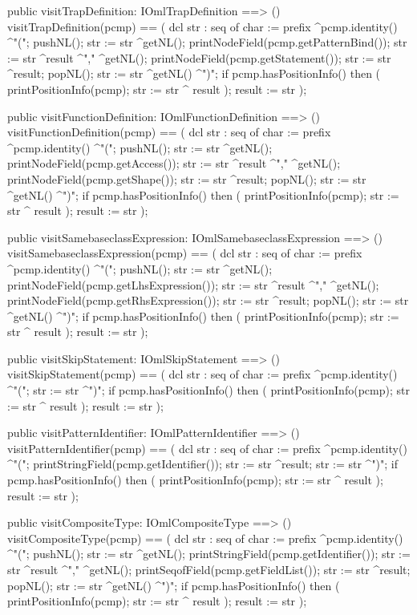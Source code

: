 \begin{vdm_al}
  public visitTrapDefinition: IOmlTrapDefinition ==> ()
  visitTrapDefinition(pcmp) ==
    ( dcl str : seq of char := prefix ^pcmp.identity() ^"(";
      pushNL();
      str := str ^getNL();
      printNodeField(pcmp.getPatternBind());
      str := str ^result ^"," ^getNL();
      printNodeField(pcmp.getStatement());
      str := str ^result;
      popNL();
      str := str ^getNL() ^")";
      if pcmp.hasPositionInfo()
      then ( printPositionInfo(pcmp);
             str := str ^ result );
      result := str );

  public visitFunctionDefinition: IOmlFunctionDefinition ==> ()
  visitFunctionDefinition(pcmp) ==
    ( dcl str : seq of char := prefix ^pcmp.identity() ^"(";
      pushNL();
      str := str ^getNL();
      printNodeField(pcmp.getAccess());
      str := str ^result ^"," ^getNL();
      printNodeField(pcmp.getShape());
      str := str ^result;
      popNL();
      str := str ^getNL() ^")";
      if pcmp.hasPositionInfo()
      then ( printPositionInfo(pcmp);
             str := str ^ result );
      result := str );

  public visitSamebaseclassExpression: IOmlSamebaseclassExpression ==> ()
  visitSamebaseclassExpression(pcmp) ==
    ( dcl str : seq of char := prefix ^pcmp.identity() ^"(";
      pushNL();
      str := str ^getNL();
      printNodeField(pcmp.getLhsExpression());
      str := str ^result ^"," ^getNL();
      printNodeField(pcmp.getRhsExpression());
      str := str ^result;
      popNL();
      str := str ^getNL() ^")";
      if pcmp.hasPositionInfo()
      then ( printPositionInfo(pcmp);
             str := str ^ result );
      result := str );

  public visitSkipStatement: IOmlSkipStatement ==> ()
  visitSkipStatement(pcmp) ==
    ( dcl str : seq of char := prefix ^pcmp.identity() ^"(";
      str := str ^")";
      if pcmp.hasPositionInfo()
      then ( printPositionInfo(pcmp);
             str := str ^ result );
      result := str );

  public visitPatternIdentifier: IOmlPatternIdentifier ==> ()
  visitPatternIdentifier(pcmp) ==
    ( dcl str : seq of char := prefix ^pcmp.identity() ^"(";
      printStringField(pcmp.getIdentifier());
      str := str ^result;
      str := str ^")";
      if pcmp.hasPositionInfo()
      then ( printPositionInfo(pcmp);
             str := str ^ result );
      result := str );

  public visitCompositeType: IOmlCompositeType ==> ()
  visitCompositeType(pcmp) ==
    ( dcl str : seq of char := prefix ^pcmp.identity() ^"(";
      pushNL();
      str := str ^getNL();
      printStringField(pcmp.getIdentifier());
      str := str ^result ^"," ^getNL();
      printSeqofField(pcmp.getFieldList());
      str := str ^result;
      popNL();
      str := str ^getNL() ^")";
      if pcmp.hasPositionInfo()
      then ( printPositionInfo(pcmp);
             str := str ^ result );
      result := str );


\end{vdm_al}
